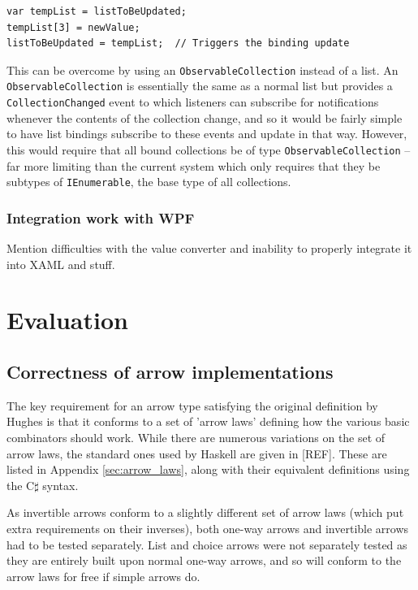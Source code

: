\documentclass[12pt,twoside,notitlepage]{report}
\begin{document}
\begin{lstlisting}[language={[Sharp]C}, caption={Explicitly reassigning a list to trigger a binding update}]
var tempList = listToBeUpdated;
tempList[3] = newValue;
listToBeUpdated = tempList;  // Triggers the binding update
\end{lstlisting}

This can be overcome by using an \texttt{ObservableCollection} instead of a list. An \texttt{ObservableCollection} is essentially the same as a normal list but provides a \texttt{CollectionChanged} event to which listeners can subscribe for notifications whenever the contents of the collection change, and so it would be fairly simple to have list bindings subscribe to these events and update in that way. However, this would require that all bound collections be of type \texttt{ObservableCollection} -- far more limiting than the current system which only requires that they be subtypes of \texttt{IEnumerable}, the base type of all collections.

\subsection{Integration work with WPF}

Mention difficulties with the value converter and inability to properly integrate it into XAML and stuff.

\cleardoublepage



\chapter{Evaluation}

\section{Correctness of arrow implementations}

The key requirement for an arrow type satisfying the original definition by Hughes is that it conforms to a set of 'arrow laws' defining how the various basic combinators should work. While there are numerous variations on the set of arrow laws, the standard ones used by Haskell are given in [REF]. These are listed in Appendix \ref{sec:arrow_laws}, along with their equivalent definitions using the C$\sharp$ syntax.

As invertible arrows conform to a slightly different set of arrow laws (which put extra requirements on their inverses), both one-way arrows and invertible arrows had to be tested separately. List and choice arrows were not separately tested as they are entirely built upon normal one-way arrows, and so will conform to the arrow laws for free if simple arrows do.
\end{document}

